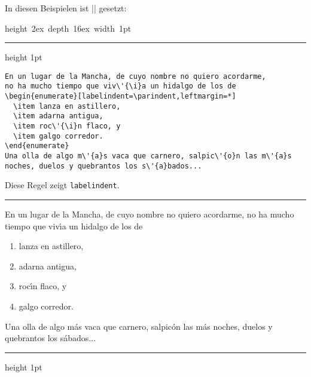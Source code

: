 \documentclass[a4paper,ngerman]{ltxguide}
\newcommand\0{\unskip\enspace\fbox{\fontsize{4}{4}\selectfont NEU 3.0}}
\newcommand\3{\unskip\enspace\fbox{\fontsize{4}{4}\selectfont NEW 3.0}}
\begin{document}
In diesen Beispielen ist || gesetzt:

\small

\newcommand{\newsample}{\vskip6pt\goodbreak\hrule height 1pt\vskip6pt}
\newcommand{\samplesep}{\vskip6pt\goodbreak\hrule\vskip6pt}
\newbox\vsep
\setbox\vsep\hbox{\vrule height 2ex depth 16ex width 1pt}
\dp{}
\newcommand\showsep{\leavevmode\llap{\copy\vsep}}

\newsample

\begin{verbatim}
En un lugar de la Mancha, de cuyo nombre no quiero acordarme,
no ha mucho tiempo que viv\'{\i}a un hidalgo de los de
\begin{enumerate}[labelindent=\parindent,leftmargin=*]
  \item lanza en astillero,
  \item adarna antigua,
  \item roc\'{\i}n flaco, y
  \item galgo corredor.
\end{enumerate}
Una olla de algo m\'{a}s vaca que carnero, salpic\'{o}n las m\'{a}s
noches, duelos y quebrantos los s\'{a}bados...
\end{verbatim}

Diese Regel zeigt \verb|labelindent|. 

\samplesep

\showsep En un lugar de la Mancha, de cuyo nombre no quiero acordarme,
no ha mucho tiempo que viv\'{\i}a un hidalgo de los de
\begin{enumerate}[labelindent=\parindent,leftmargin=*]
\item lanza en astillero,
\item adarna antigua,
\item roc\'{\i}n flaco, y
\item galgo corredor.
\end{enumerate}
Una olla de algo m\'{a}s vaca que carnero, salpic\'{o}n las m\'{a}s
noches, duelos y quebrantos los s\'{a}bados...

\newsample
\end{document}
